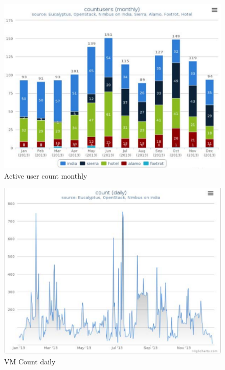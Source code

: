 \documentclass{sig-alternate-05-2015}
\begin{document}
\begin{figure}[h!] 
  \centering 
    \includegraphics[width=1.0\columnwidth]{images/usercount2.pdf} 
  \caption{Active user count monthly}\label{F:usercount-2} 
\end{figure} 

\begin{figure}[h!] 
  \centering 
    \includegraphics[width=1.0\columnwidth]{images/vmcount.pdf} 
  \caption{VM Count daily}\label{F:vmcount-1} 
\end{figure} 
\end{document}
